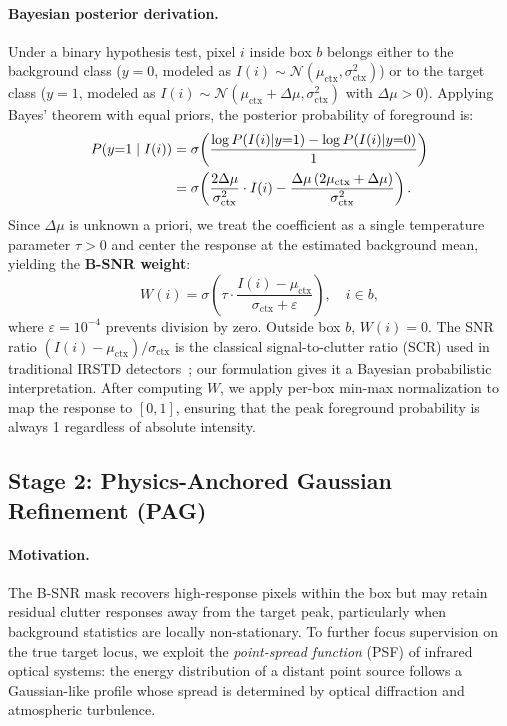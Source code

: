 \paragraph{Bayesian posterior derivation.}
Under a binary hypothesis test, pixel $i$ inside box $b$ belongs either to the
background class ($y=0$, modeled as $I(i) \sim \mathcal{N}(\mu_\mathrm{ctx},
\sigma_\mathrm{ctx}^2)$) or to the target class ($y=1$, modeled as
$I(i) \sim \mathcal{N}(\mu_\mathrm{ctx} + \Delta\mu, \sigma_\mathrm{ctx}^2)$ with
$\Delta\mu > 0$).
Applying Bayes' theorem with equal priors, the posterior probability of foreground is:
\begin{align}
    P(y{=}1 \mid I(i)) &= \sigma\!\left(\frac{\log P(I(i)|y{=}1) - \log P(I(i)|y{=}0)}{1}\right) \notag \\
    &= \sigma\!\left(\frac{2\Delta\mu}{\sigma_\mathrm{ctx}^2}\cdot I(i)
       - \frac{\Delta\mu\,(2\mu_\mathrm{ctx}+\Delta\mu)}{\sigma_\mathrm{ctx}^2}\right).
    \label{eq:posterior_full}
\end{align}
Since $\Delta\mu$ is unknown a priori, we treat the coefficient as a single
temperature parameter $\tau > 0$ and center the response at the estimated background
mean, yielding the \textbf{B-SNR weight}:
\begin{equation}
    \boxed{W(i) = \sigma\!\left(\tau \cdot \frac{I(i) - \mu_\mathrm{ctx}}
    {\sigma_\mathrm{ctx} + \varepsilon}\right)}, \quad i \in b,
    \label{eq:bsnr_final}
\end{equation}
where $\varepsilon = 10^{-4}$ prevents division by zero.
Outside box $b$, $W(i) = 0$.
The SNR ratio $(I(i)-\mu_\mathrm{ctx})/\sigma_\mathrm{ctx}$ is the classical
signal-to-clutter ratio (SCR) used in traditional IRSTD detectors~\cite{irstd_survey};
our formulation gives it a Bayesian probabilistic interpretation.
After computing $W$, we apply per-box min-max normalization to map the response to
$[0, 1]$, ensuring that the peak foreground probability is always 1 regardless of
absolute intensity.

\subsection{Stage 2: Physics-Anchored Gaussian Refinement (PAG)}
\label{sec:method_pag}

\paragraph{Motivation.}
The B-SNR mask recovers high-response pixels within the box but may retain residual
clutter responses away from the target peak, particularly when background statistics
are locally non-stationary.
To further focus supervision on the true target locus, we exploit the \emph{point-spread
function} (PSF) of infrared optical systems: the energy distribution of a distant
point source follows a Gaussian-like profile whose spread is determined by optical
diffraction and atmospheric turbulence.


